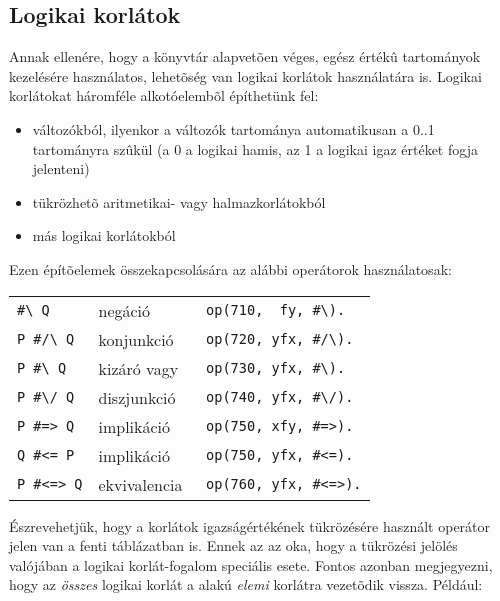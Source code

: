 \subsection{Logikai korlátok}

Annak ellenére, hogy a \clpfd könyvtár alapvetõen véges, egész értékû tartományok 
kezelésére használatos, lehetõség van logikai korlátok használatára is. Logikai
korlátokat háromféle alkotóelembõl építhetünk fel:

\begin{itemize}
\item változókból, ilyenkor a változók tartománya automatikusan a 0..1 tartományra
szûkül (a 0 a logikai hamis, az 1 a logikai igaz értéket fogja jelenteni)
\item tükrözhetõ aritmetikai- vagy halmazkorlátokból
\item más logikai korlátokból
\end{itemize}

Ezen építõelemek összekapcsolására az alábbi operátorok használatosak:

\begin{center}\begin{tabular}{|l|l|l|}
\hline
\verb'#\ Q'     &           negáció\ \ \ \ \ & \verb'op(710,  fy, #\).'\\
\verb'P #/\ Q'  &           konjunkció       & \verb'op(720, yfx, #/\).'\\
\verb'P #\ Q'   &           kizáró vagy      & \verb'op(730, yfx, #\).'\\
\verb'P #\/ Q'  &           diszjunkció      & \verb'op(740, yfx, #\/).'\\
\verb'P #=> Q'  &           implikáció       & \verb'op(750, xfy, #=>).'\\
\verb'Q #<= P'  &           implikáció       & \verb'op(750, yfx, #<=).'\\
\verb'P #<=> Q' &           ekvivalencia     & \verb'op(760, yfx, #<=>).'\\
\hline
\end{tabular}\end{center}

Észrevehetjük, hogy a korlátok igazságértékének tükrözésére használt \cd{\#<=>}
operátor jelen van a fenti táblázatban is. Ennek az az oka, hogy a tükrözési
jelölés valójában a logikai korlát-fogalom speciális esete. Fontos azonban megjegyezni,
hogy az \emph{összes} logikai korlát a  alakú \emph{elemi}
korlátra vezetõdik vissza. Például:

\begin{center}
\end{center}

